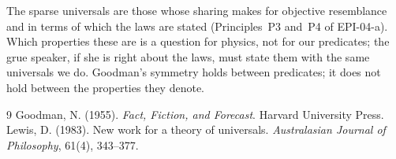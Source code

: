 \documentclass{situationist-preprint}
\begin{document}
\begin{reply}
The sparse universals are those whose sharing makes for objective resemblance and in terms of which the laws are stated (Principles~P3 and~P4 of EPI-04-a). Which properties these are is a question for physics, not for our predicates; the grue speaker, if she is right about the laws, must state them with the same universals we do. Goodman's symmetry holds between predicates; it does not hold between the properties they denote.
\end{reply}

\begin{thebibliography}{9}\small
{} Goodman, N. (1955). \emph{Fact, Fiction, and Forecast}. Harvard University Press.
 Lewis, D. (1983). New work for a theory of universals. \emph{Australasian Journal of Philosophy}, 61(4), 343--377.
\end{thebibliography}
\end{document}
